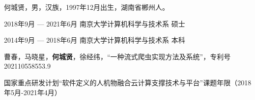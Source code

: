 \documentclass[master]{njuthesis}
\begin{document}
\backmatter
\begin{resume}
\begin{authorinfo}
\noindent 何城贤，男，汉族，1997年12月出生，湖南省郴州人。
\end{authorinfo}
\begin{education}
\item[2018年9月 --- 2021年6月] 南京大学计算机科学与技术系 \hfill 硕士
\item[2014年9月 --- 2018年6月] 南京大学计算机科学与技术系 \hfill 本科
\end{education}
\begin{publications}
\item 曹春，马晓星，\textbf{何城贤}，徐经纬，“一种流式爬虫实现方法及系统”，专利号202110558553.9
\end{publications}

\begin{projects}
\item 国家重点研发计划“软件定义的人机物融合云计算支撑技术与平台”课题年限（2018年5月-2021年4月）
\end{projects}
\end{resume}

\makelicense


\end{document}
